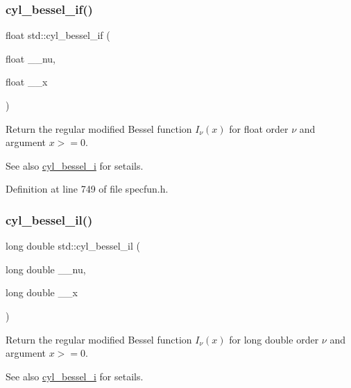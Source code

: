 \subsubsection{\texorpdfstring{cyl\+\_\+bessel\+\_\+if()}{cyl\_bessel\_if()}}
{\footnotesize\ttfamily float std\+::cyl\+\_\+bessel\+\_\+if (\begin{DoxyParamCaption}\item[{float}]{\+\_\+\+\_\+nu,  }\item[{float}]{\+\_\+\+\_\+x }\end{DoxyParamCaption})\hspace{0.3cm}{\ttfamily [inline]}}

Return the regular modified Bessel function $ I_{\nu}(x) $ for {\ttfamily float} order $ \nu $ and argument $ x >= 0 $.

\begin{DoxySeeAlso}{See also}
\hyperlink{group__mathsf__std_ga29504b6008798072b0b8d6ea5a50ec60}{cyl\+\_\+bessel\+\_\+i} for setails. 
\end{DoxySeeAlso}


Definition at line 749 of file specfun.\+h.

\mbox{\label{group__mathsf__std_gab7962629216d03efb8ecaa3f70c6878f}} 
\subsubsection{\texorpdfstring{cyl\+\_\+bessel\+\_\+il()}{cyl\_bessel\_il()}}
{\footnotesize\ttfamily long double std\+::cyl\+\_\+bessel\+\_\+il (\begin{DoxyParamCaption}\item[{long double}]{\+\_\+\+\_\+nu,  }\item[{long double}]{\+\_\+\+\_\+x }\end{DoxyParamCaption})\hspace{0.3cm}{\ttfamily [inline]}}

Return the regular modified Bessel function $ I_{\nu}(x) $ for {\ttfamily long double} order $ \nu $ and argument $ x >= 0 $.

\begin{DoxySeeAlso}{See also}
\hyperlink{group__mathsf__std_ga29504b6008798072b0b8d6ea5a50ec60}{cyl\+\_\+bessel\+\_\+i} for setails. 
\end{DoxySeeAlso}


